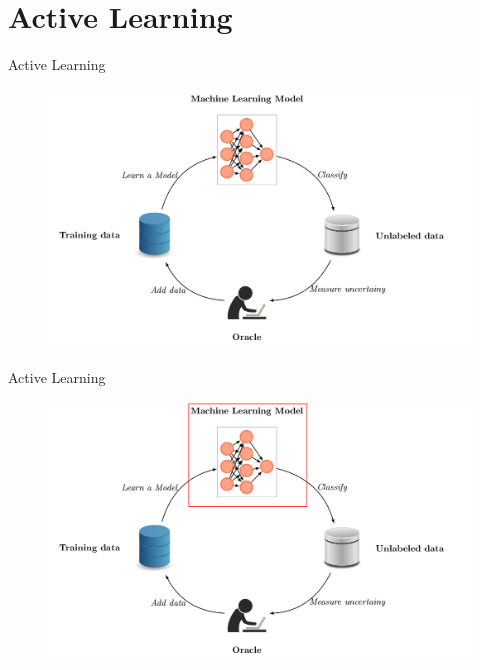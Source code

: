 \documentclass[10pt]{beamer}
\begin{document}
\section{Active Learning}

\begin{frame}[fragile]{Active Learning}
    \begin{figure}[htp]
        \centering
        \includegraphics[scale=0.3]{images/active_learning.png}
    \end{figure}
\end{frame}

\begin{frame}[fragile]{Active Learning}
    \begin{figure}[htp]
        \centering
        \includegraphics[scale=0.3]{images/active_learning_ml_model.png}
    \end{figure}
\end{frame}
\end{document}
